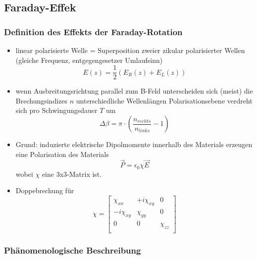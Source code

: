 \subsection{Faraday-Effek}
\subsubsection*{Definition des Effekts der Faraday-Rotation}
\begin{itemize}
    \item linear polarisierte Welle = Superposition zweier zikular polarisierter Wellen (gleiche Frequenz, entgegengesetzer Umlaufsinn)
        \begin{equation*}
            E(z)=\frac{1}{2}(E_R(z)+E_L(z))    
        \end{equation*}
    \item wenn Ausbreitungsrichtung parallel zum B-Feld unterscheiden sich (meist) die Brechungsindizes $n$
        \to unterschiedliche Wellenlängen
        \iff Polarisationsebene verdreht sich pro Schwingungsdauer $T$ um 
        \begin{equation*}
            \Delta\beta=\pi\cdot\left(\frac{n_{rechts}}{n_{links}}-1\right)
        \end{equation*} 
    \item Grund: induzierte elektrische Dipolmomente innerhalb des Materials erzeugen eine Polarisation des Materials
        \begin{equation*}
            \vec{P}=\epsilon_0 \chi\vec{E}
        \end{equation*}
        wobei $\chi$ eine 3x3-Matrix ist.
    \item Doppebrechung für 
        \begin{equation*}
            \chi = \left[ 
            \begin{array}{ccc}
                \chi_{xx}          & +i\chi_{xy} & 0         \\ 
                -i\chi_{xy}   & \chi_{yy}        & 0         \\
                0                  & 0                & \chi_{zz} \\ 
            \end{array}
            \right]
        \end{equation*}
\end{itemize}

\subsubsection*{Phänomenologische Beschreibung}


